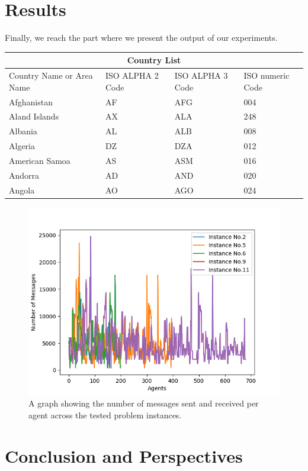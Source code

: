 \documentclass{article}
\begin{document}
	\section{Results}
	Finally, we reach the part where we present the output of our experiments. 
	
	
	\begin{tabular}{ |p{3cm}||p{3cm}|p{3cm}|p{3cm}|  }
		\hline
		\multicolumn{4}{|c|}{Country List} \\
		\hline
		Country Name     or Area Name& ISO ALPHA 2 Code &ISO ALPHA 3 Code&ISO numeric Code\\
		\hline
		Afghanistan   & AF    &AFG&   004\\
		Aland Islands&   AX  & ALA   &248\\
		Albania &AL & ALB&  008\\
		Algeria    &DZ & DZA&  012\\
		American Samoa&   AS  & ASM&016\\
		Andorra& AD  & AND   &020\\
		Angola& AO  & AGO&024\\
		\hline
	\end{tabular}
	
	
	
	
	
	
	\begin{figure}
		\centering
		\includegraphics[scale=0.8]{figure/messages.png}
		\caption{A graph showing the number of messages sent and received per agent across the tested problem instances.}
		\label{results:messages}
	\end{figure}
	\section{Conclusion and Perspectives}
	\newpage
	
	
\end{document}
